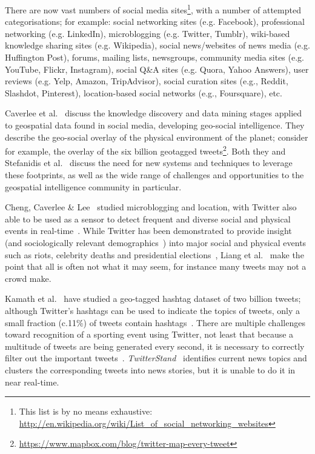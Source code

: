\documentclass[conference]{IEEEtran}
\begin{document}
There are now vast numbers of social media sites\footnote{This list is
by no means exhaustive:
\url{http://en.wikipedia.org/wiki/List_of_social_networking_websites}},
with a number of attempted categorisations; for example: social
networking sites (e.g. Facebook), professional networking
(e.g. LinkedIn), microblogging (e.g. Twitter, Tumblr), wiki-based
knowledge sharing sites (e.g.  Wikipedia), social news/websites of
news media (e.g. Huffington Post), forums, mailing lists, newsgroups,
community media sites (e.g. YouTube, Flickr, Instagram), social Q\&A
sites (e.g. Quora, Yahoo Answers), user reviews (e.g. Yelp, Amazon,
TripAdvisor), social curation sites (e.g., Reddit, Slashdot,
Pinterest), location-based social networks (e.g., Foursquare), etc.

Caverlee et al.~\cite{caverlee-et-al:2013} discuss the knowledge
discovery and data mining stages applied to geospatial data found in
social media, developing geo-social intelligence. They describe the
geo-social overlay of the physical environment of the planet; consider
for example, the overlay of the six billion geotagged
tweets\footnote{\url{https://www.mapbox.com/blog/twitter-map-every-tweet}}. Both
they and Stefanidis et al.~\cite{stefanidis-et-al:2014} discuss the
need for new systems and techniques to leverage these footprints, as
well as the wide range of challenges and opportunities to the
geospatial intelligence community in particular.

Cheng, Caverlee \& Lee~\cite{cheng-et-al:2010} studied microblogging
and location, with Twitter also able to be used as a sensor to detect
frequent and diverse social and physical events in
real-time~\cite{zhao-et-al:2011}. While Twitter has been demonstrated
to provide insight (and sociologically relevant
demographics~\cite{sloan-et-al:2013}) into major social and physical
events such as riots, celebrity deaths and presidential
elections~\cite{procter-et-al:2013,burnap-et-al:2014}, Liang et
al.~\cite{liang-et-al:2013} make the point that all is often not what
it may seem, for instance many tweets may not a crowd make.

Kamath et al.~\cite{kamath-et-al:2013} have studied a geo-tagged
hashtag dataset of two billion tweets; although Twitter's hashtags can
be used to indicate the topics of tweets, only a small fraction
(c.11\%) of tweets contain hashtags~\cite{ganne:2010}. There are
multiple challenges toward recognition of a sporting event using
Twitter, not least that because a multitude of tweets are being
generated every second, it is necessary to correctly filter out the
important
tweets~\cite{ganne:2010}. {\emph{TwitterStand}}~\cite{sankaranarayanan-et-al:2009}
identifies current news topics and clusters the corresponding tweets
into news stories, but it is unable to do it in near real-time.
\end{document}
